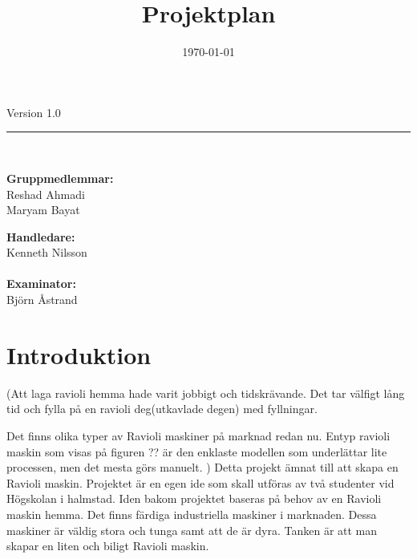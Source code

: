 \documentclass[a4paper]{article}
\title{Projektplan}
\date{\today}
\begin{document}
\maketitle

\begin{center}
\large{Version 1.0}   			%
\ \\[1cm]
\hrule
\ \\[1cm]
\begin{minipage}{0.5\textwidth}
	\begin{flushleft} \large
		\textbf{Gruppmedlemmar:} \\
		Reshad Ahmadi \\
		Maryam Bayat \\
		
		
	\end{flushleft}
\end{minipage}
\begin{minipage}{0.4\textwidth}
	\begin{flushright} \large
		\textbf{Handledare:} \\
		Kenneth Nilsson \\
		\ \\				
		\textbf{Examinator:} \\
		Björn Åstrand
	\end{flushright}
\end{minipage}
\end{center}

\clearpage

\tableofcontents
\newpage



\section{Introduktion} %
(Att laga ravioli hemma hade varit jobbigt och tidskrävande. Det tar välfigt lång tid och fylla på en ravioli deg(utkavlade degen) med fyllningar. 

Det finns olika typer av Ravioli maskiner på marknad redan nu. Entyp ravioli maskin som visas på figuren ?? är den enklaste modellen som underlättar lite processen, men det mesta görs manuelt. )
Detta projekt  ämnat till att skapa en Ravioli maskin. Projektet är en egen ide som skall utföras av två studenter vid Högskolan i halmstad.
Iden bakom projektet baseras på behov av en Ravioli maskin hemma.
Det finns färdiga industriella maskiner i marknaden. Dessa maskiner är väldig stora och tunga samt att de är dyra. 
Tanken är att man skapar en liten och biligt Ravioli maskin.
\end{document}
